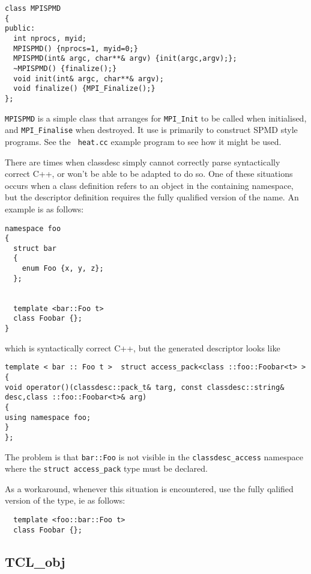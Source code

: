 
\begin{verbatim}
class MPISPMD
{
public:
  int nprocs, myid;
  MPISPMD() {nprocs=1, myid=0;}
  MPISPMD(int& argc, char**& argv) {init(argc,argv);};
  ~MPISPMD() {finalize();}
  void init(int& argc, char**& argv);
  void finalize() {MPI_Finalize();}
};
\end{verbatim}

{\tt MPISPMD} is a simple class that arranges for \verb+MPI_Init+ to
be called when initialised, and \verb+MPI_Finalise+ when destroyed. It
use is primarily to construct SPMD style programs. See the {\tt
heat.cc} example program to see how it might be used.


There are times when classdesc simply cannot correctly parse
syntactically correct C++, or won't be able to be adapted to do
so. One of these situations occurs when a class definition refers to
an object in the containing namespace, but the descriptor definition
requires the fully qualified version of the name. An example is as
follows:

\begin{verbatim}
namespace foo
{
  struct bar
  {
    enum Foo {x, y, z};
  };


  template <bar::Foo t>
  class Foobar {};
}
\end{verbatim}
which is syntactically correct C++, but the generated descriptor looks
like
\begin{verbatim}
template < bar :: Foo t >  struct access_pack<class ::foo::Foobar<t> > {
void operator()(classdesc::pack_t& targ, const classdesc::string& desc,class ::foo::Foobar<t>& arg)
{
using namespace foo;
}
};
\end{verbatim}
The problem is that \verb+bar::Foo+ is not visible in the
\verb+classdesc_access+ namespace where the \verb+struct access_pack+
type must be declared.

As a workaround, whenever this situation is encountered, use the fully
qalified version of the type, ie as follows:
\begin{verbatim}
  template <foo::bar::Foo t>
  class Foobar {};
\end{verbatim}

\subsection{TCL\_obj}\label{TCL_obj}

